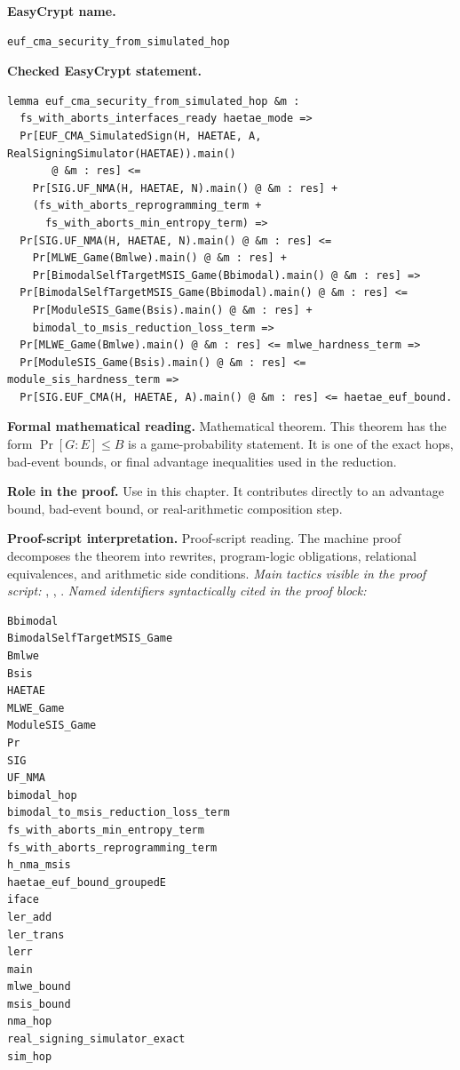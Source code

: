 \begin{formaltheorem}
\noindent\textbf{EasyCrypt name.}
\begin{lstlisting}[language=EasyCrypt,basicstyle=\ttfamily\scriptsize]
euf_cma_security_from_simulated_hop
\end{lstlisting}
\noindent\textbf{Checked EasyCrypt statement.}
\begin{lstlisting}[language=EasyCrypt,basicstyle=\ttfamily\scriptsize]
lemma euf_cma_security_from_simulated_hop &m :
  fs_with_aborts_interfaces_ready haetae_mode =>
  Pr[EUF_CMA_SimulatedSign(H, HAETAE, A, RealSigningSimulator(HAETAE)).main()
       @ &m : res] <=
    Pr[SIG.UF_NMA(H, HAETAE, N).main() @ &m : res] +
    (fs_with_aborts_reprogramming_term +
      fs_with_aborts_min_entropy_term) =>
  Pr[SIG.UF_NMA(H, HAETAE, N).main() @ &m : res] <=
    Pr[MLWE_Game(Bmlwe).main() @ &m : res] +
    Pr[BimodalSelfTargetMSIS_Game(Bbimodal).main() @ &m : res] =>
  Pr[BimodalSelfTargetMSIS_Game(Bbimodal).main() @ &m : res] <=
    Pr[ModuleSIS_Game(Bsis).main() @ &m : res] +
    bimodal_to_msis_reduction_loss_term =>
  Pr[MLWE_Game(Bmlwe).main() @ &m : res] <= mlwe_hardness_term =>
  Pr[ModuleSIS_Game(Bsis).main() @ &m : res] <= module_sis_hardness_term =>
  Pr[SIG.EUF_CMA(H, HAETAE, A).main() @ &m : res] <= haetae_euf_bound.
\end{lstlisting}
\noindent\textbf{Formal mathematical reading.}
Mathematical theorem. This theorem has the form \(\Pr[G:E] \le B\) is a game-probability statement.  It is one of the exact hops, bad-event bounds, or final advantage inequalities used in the reduction.

\noindent\textbf{Role in the proof.}
Use in this chapter. It contributes directly to an advantage bound, bad-event bound, or real-arithmetic composition step.

\noindent\textbf{Proof-script interpretation.}
Proof-script reading. The machine proof decomposes the theorem into rewrites, program-logic obligations, relational equivalences, and arithmetic side conditions.
\emph{Main tactics visible in the proof script:} , , .
\emph{Named identifiers syntactically cited in the proof block:}
\begin{lstlisting}[language=EasyCrypt,basicstyle=\ttfamily\scriptsize]
Bbimodal
BimodalSelfTargetMSIS_Game
Bmlwe
Bsis
HAETAE
MLWE_Game
ModuleSIS_Game
Pr
SIG
UF_NMA
bimodal_hop
bimodal_to_msis_reduction_loss_term
fs_with_aborts_min_entropy_term
fs_with_aborts_reprogramming_term
h_nma_msis
haetae_euf_bound_groupedE
iface
ler_add
ler_trans
lerr
main
mlwe_bound
msis_bound
nma_hop
real_signing_simulator_exact
sim_hop
\end{lstlisting}

\end{formaltheorem}

